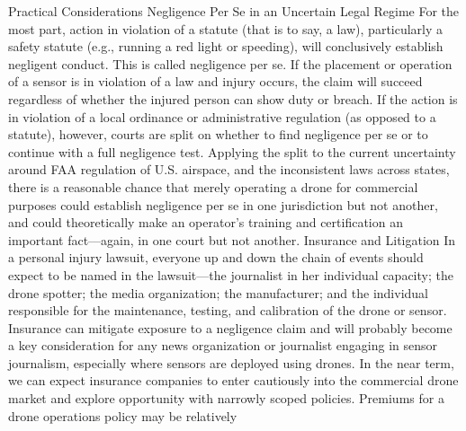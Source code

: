 Practical Considerations
Negligence Per Se in an Uncertain Legal Regime
For the most part, action in violation of a statute (that is to say, a law), particularly
a safety statute (e.g., running a red light or speeding), will conclusively
establish negligent conduct. This is called negligence per se. If the
placement or operation of a sensor is in violation of a law and injury occurs,
the claim will succeed regardless of whether the injured person can show
duty or breach. If the action is in violation of a local ordinance or administrative
regulation (as opposed to a statute), however, courts are split on
whether to find negligence per se or to continue with a full negligence test.
Applying the split to the current uncertainty around FAA regulation of U.S.
airspace, and the inconsistent laws across states, there is a reasonable chance
that merely operating a drone for commercial purposes could establish negligence
per se in one jurisdiction but not another, and could theoretically
make an operator's training and certification an important fact—again, in
one court but not another.
Insurance and Litigation
In a personal injury lawsuit, everyone up and down the chain of events
should expect to be named in the lawsuit—the journalist in her individual
capacity; the drone spotter; the media organization; the manufacturer; and
the individual responsible for the maintenance, testing, and calibration of
the drone or sensor.
Insurance can mitigate exposure to a negligence claim and will probably
become a key consideration for any news organization or journalist engaging
in sensor journalism, especially where sensors are deployed using drones.
In the near term, we can expect insurance companies to enter cautiously
into the commercial drone market and explore opportunity with narrowly
scoped policies. Premiums for a drone operations policy may be relatively

